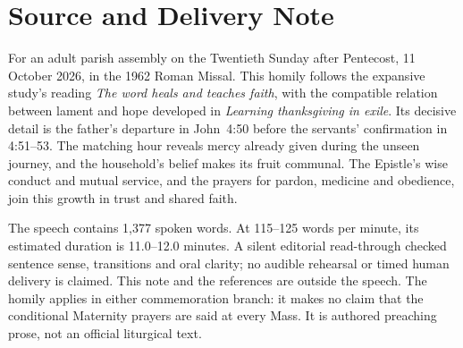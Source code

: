 \section{Source and Delivery Note}
For an adult parish assembly on the Twentieth Sunday after Pentecost,
11 October 2026, in the 1962 Roman Missal. This homily follows the
expansive study's reading \emph{The word heals and teaches faith},
with the compatible relation between lament and hope developed in
\emph{Learning thanksgiving in exile}. Its decisive detail is the
father's departure in John~4:50 before the servants' confirmation in
4:51--53. The matching hour reveals mercy already given during the
unseen journey, and the household's belief makes its fruit communal.
The Epistle's wise conduct and mutual service, and the prayers for
pardon, medicine and obedience, join this growth in trust and shared faith.

The speech contains 1,377 spoken words. At 115--125 words per minute,
its estimated duration is 11.0--12.0 minutes. A silent editorial read-through
checked sentence sense, transitions and oral clarity; no audible rehearsal
or timed human delivery is claimed. This note and the references are
outside the speech. The homily applies in either commemoration branch:
it makes no claim that the conditional Maternity prayers are said at
every Mass. It is authored preaching prose, not an official liturgical text.

